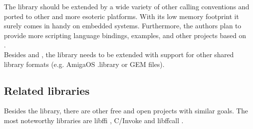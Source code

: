 The  library should be extended by a wide variety of other
calling conventions and ported to other and more esoteric platforms. With its
low memory footprint it surely comes in handy on embedded systems.
Furthermore, the authors plan to provide more scripting language bindings,
examples, and other projects based on .\\
Besides  and , the 
library needs to be extended with support for other shared library formats
(e.g. AmigaOS .library or GEM \cite{.ldg} files).


\subsection{Related libraries}

Besides the  library, there are other free and open projects
with similar goals. The most noteworthy libraries are libffi \cite{libffi},
C/Invoke \cite{cinvoke} and libffcall \cite{libffcall}.

